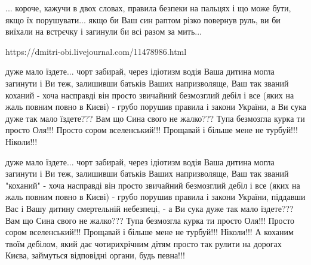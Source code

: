 ... короче, кажучи в двох словах, правила безпеки на пальцях і що може бути,
якщо їх порушувати... якщо би Ваш син раптом різко повернув руль, ви би виїхали
на встрєчку і загинули би всі разом за мить...

https://dmitri-obi.livejournal.com/11478986.html

дуже мало їздете... чорт забирай, через ідіотизм водія Ваша дитина могла загинути і Ви теж,
залишивши батьків Ваших напризволяще,
Ваш так званий коханий - хоча насправді він просто звичайний безмозглий дебіл і все (яких на жаль повним повно в Києві) - грубо порушив правила і закони України, а Ви сука дуже так мало їздете???
Вам що Сина свого не жалко??? Тупа безмозгла курка ти просто Оля!!!
Просто сором вселенський!!!
Прощавай і більше мене не турбуй!!! Ніколи!!!

дуже мало їздете... чорт забирай, через ідіотизм водія Ваша дитина могла загинути і Ви теж,
залишивши батьків Ваших напризволяще,
Ваш так званий "коханий" - хоча насправді він просто звичайний безмозглий дебіл і все (яких на жаль повним повно в Києві) -   грубо порушив правила і закони України, піддавши Вас і Вашу дитину смертельній небезпеці, - а Ви сука дуже так мало їздете???
Вам що Сина свого не жалко??? Тупа безмозгла курка ти просто Оля!!!
Просто сором вселенський!!!
Прощавай і більше мене не турбуй!!! Ніколи!!! А коханим твоїм дебілом, який дає чотирихрічним дітям просто так рулити на дорогах Києва, займуться відповідні органи, будь певна!!!
